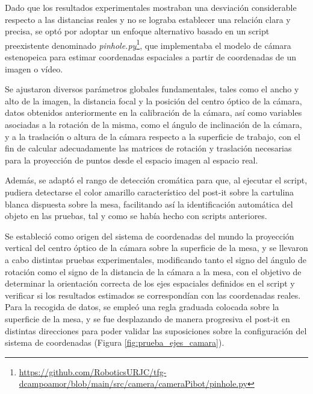 Dado que los resultados experimentales mostraban una desviación considerable respecto a las distancias reales y no se lograba establecer una relación clara y precisa, se optó por adoptar un enfoque alternativo basado en un script preexistente denominado \textit{pinhole.py}\footnote{\url{https://github.com/RoboticsURJC/tfg-dcampoamor/blob/main/src/camera/cameraPibot/pinhole.py}}, que implementaba el modelo de cámara estenopeica para estimar coordenadas espaciales a partir de coordenadas de un imagen o vídeo. 

Se ajustaron diversos parámetros globales fundamentales, tales como el ancho y alto de la imagen, la distancia focal y la posición del centro óptico de la cámara, datos obtenidos anteriormente en la calibración de la cámara, así como variables asociadas a la rotación de la misma, como el ángulo de inclinación de la cámara, y a la traslación o altura de la cámara respecto a la superficie de trabajo, con el fin de calcular adecuadamente las matrices de rotación y traslación necesarias para la proyección de puntos desde el espacio imagen al espacio real. 

Además, se adaptó el rango de detección cromática para que, al ejecutar el script, pudiera detectarse el color amarillo característico del post-it sobre la cartulina blanca dispuesta sobre la mesa, facilitando así la identificación automática del objeto en las pruebas, tal y como se había hecho con scripts anteriores.

Se estableció como origen del sistema de coordenadas del mundo la proyección vertical del centro óptico de la cámara sobre la superficie de la mesa, y se llevaron a cabo distintas pruebas experimentales, modificando tanto el signo del ángulo de rotación como el signo de la distancia de la cámara a la mesa, con el objetivo de determinar la orientación correcta de los ejes espaciales definidos en el script y verificar si los resultados estimados se correspondían con las coordenadas reales. Para la recogida de datos, se empleó una regla graduada colocada sobre la superficie de la mesa, y se fue desplazando de manera progresiva el post-it en distintas direcciones para poder validar las suposiciones sobre la configuración del sistema de coordenadas (Figura \ref{fig:prueba_ejes_camara}).

